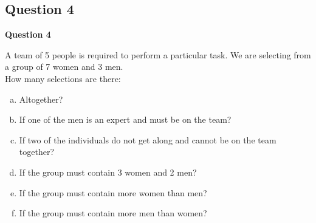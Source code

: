 \documentclass[compress]{beamer}        %
\makeatletter
\newcommand{\tcb}{\textcolor{beamer@blendedblue}}
\makeatother
\begin{document}
\subsection{Question 4}
\begin{frame}{\bf \tcb{Question 4}}

A team of 5 people is required to perform a particular task. We are selecting from a group of 7 women and 3 men.\\[0.2cm]
How many selections are there:
\begin{enumerate}[a)]\itemsep0.2cm
\item Altogether?
\item If one of the men is an expert and must be on the team?
\item If two of the individuals do not get along and cannot be on the team together?
\item If the group must contain 3 women and 2 men?
\item If the group must contain more women than men?
\item If the group must contain more men than women?
\end{enumerate}



\end{frame}
\end{document}
